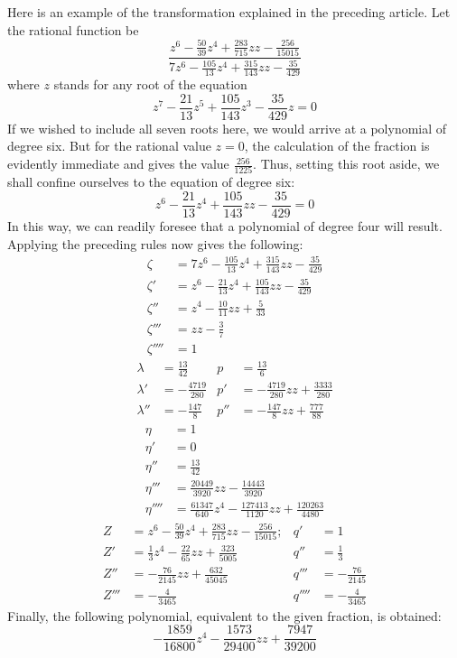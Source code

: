 Here is an example of the transformation explained in the preceding article. Let the rational function be
\[
\frac{z^6-\frac{50}{39}z^4+\frac{283}{715}zz-\frac{256}{15015}}{7z^6-\frac{105}{13}z^4+\frac{315}{143}zz-\frac{35}{429}}
\]
where $z$ stands for any root of the equation
\[
z^7-\frac{21}{13}z^5+\frac{105}{143}z^3-\frac{35}{429}z=0
\]
If we wished to include all seven roots here, we would arrive at a polynomial of degree six. But for the rational value $z=0$, the calculation of the fraction is evidently immediate and gives the value $\frac{256}{1225}$. Thus, setting this root aside, we shall confine ourselves to the equation of degree six:
\[
z^6-\frac{21}{13}z^4+\frac{105}{143}zz-\frac{35}{429}=0
\]
In this way, we can readily foresee that a polynomial of degree four will result. Applying the preceding rules now gives the following:
\[
\begin{aligned}
\zeta&=7z^6-\frac{105}{13}z^4+\frac{315}{143}zz-\frac{35}{429}\\[5pt]
\zeta'&=z^6-\frac{21}{13}z^4+\frac{105}{143}zz-\frac{35}{429}\\[5pt]
\zeta''&=z^4-\frac{10}{11}zz+\frac{5}{33}\\[5pt]
\zeta'''&=zz-\frac{3}{7}\\[5pt]
\zeta''''&=1
\end{aligned}\]
\[\begin{aligned}
\lambda&=\frac{13}{42}&p&=\frac{13}{6}\\[5pt]
\lambda'&=-\frac{4719}{280}&p'&=-\frac{4719}{280}zz+\frac{3333}{280}\\[5pt]
\lambda''&=-\frac{147}{8}&p''&=-\frac{147}{8}zz+\frac{777}{88}
\end{aligned}\]
\[\begin{aligned}
\eta&=1\\[5pt]
\eta'&=0\\[5pt]
\eta''&=\frac{13}{42}\\[5pt]
\eta'''&=\frac{20449}{3920}zz-\frac{14443}{3920}\\[5pt]
\eta''''&=\frac{61347}{640}z^4-\frac{127413}{1120}zz+\frac{120263}{4480}
\end{aligned}\]
\[\begin{aligned}
Z&=z^6-\frac{50}{39}z^4+\frac{283}{715}zz-\frac{256}{15015};&q'&=1\\[5pt]
Z'&=\frac{1}{3}z^4-\frac{22}{65}zz+\frac{323}{5005}&q''&=\frac{1}{3}\\[5pt]
Z''&=-\frac{76}{2145}zz+\frac{632}{45045}&q'''&=-\frac{76}{2145}\\[5pt]
Z'''&=-\frac{4}{3465}&q''''&=-\frac{4}{3465}
\end{aligned}
\]
Finally, the following polynomial, equivalent to the given fraction, is obtained:
\[
-\frac{1859}{16800}z^4-\frac{1573}{29400}zz+\frac{7947}{39200}
\]

